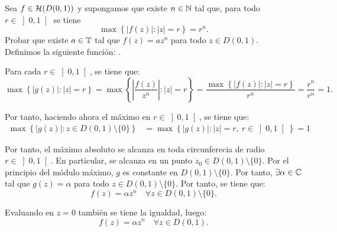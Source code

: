 \begin{ejercicio}
    Sea $f\in \mathcal{H}(D(0,1))$ y supongamos que existe $n\in \mathbb{N}$ tal que, para todo $r\in \left]0,1\right[$ se tiene
    \begin{equation*}
        \max\left\{ |f(z)| : |z| = r \right\} = r^n.
    \end{equation*}
    Probar que existe $a\in \mathbb{T}$ tal que $f(z) = az^n$ para todo $z\in D(0,1)$.\\

    Definimos la siguiente función:
    .

    Para cada $r\in \left]0,1\right[$, se tiene que:
    \begin{equation*}
        \max\left\{ |g(z)| : |z| = r \right\} = \max\left\{ \left| \frac{f(z)}{z^n} \right| : |z| = r \right\} = \dfrac{\max\left\{ |f(z)| : |z| = r \right\}}{r^n} = \dfrac{r^n}{r^n} = 1.
    \end{equation*}

    Por tanto, haciendo ahora el máximo en $r\in \left]0,1\right[$, se tiene que:
    \begin{align*}
        \max\left\{ |g(z)| : z\in D(0,1)\setminus \{0\} \right\} &= \max\left\{ |g(z)| : |z| = r,\ r\in \left]0,1\right[ \right\} = 1
    \end{align*}

    Por tanto, el máximo absoluto se alcanza en toda circunferecia de radio $r\in \left]0,1\right[$. En particular, se alcanza en un punto $z_0\in D(0,1)\setminus \{0\}$. Por el principio del módulo máximo, $g$ es constante en $D(0,1)\setminus \{0\}$. Por tanto, $\exists \alpha\in \mathbb{C}$ tal que $g(z) = \alpha$ para todo $z\in D(0,1)\setminus \{0\}$. Por tanto, se tiene que:
    \begin{equation*}
        f(z) = \alpha z^n \quad \forall z\in D(0,1)\setminus \{0\}.
    \end{equation*}

    Evaluando en $z = 0$ también se tiene la igualdad, luego:
    \begin{equation*}
        f(z) = \alpha z^n \quad \forall z\in D(0,1).
    \end{equation*}
\end{ejercicio}

